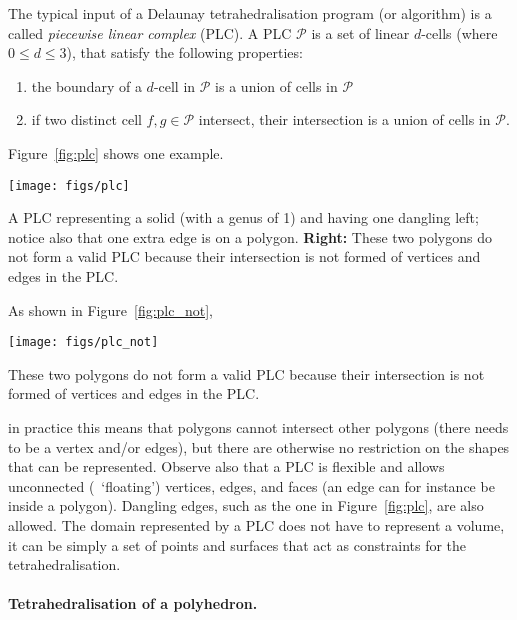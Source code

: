 The typical input of a Delaunay tetrahedralisation program (or algorithm) is a called \emph{piecewise linear complex} (PLC).
A PLC $\mathcal{P}$ is a set of linear $d$-cells (where $0 \leq d \leq 3$), that satisfy the following properties:
\begin{enumerate}
  \item the boundary of a $d$-cell in $\mathcal{P}$ is a union of cells in $\mathcal{P}$
  \item if two distinct cell $f, g \in \mathcal{P}$ intersect, their intersection is a union of cells in $\mathcal{P}$.
\end{enumerate}
Figure~\ref{fig:plc} shows one example.
\begin{marginfigure}
  \centering
  \texttt{[image: figs/plc]}
  \caption{A PLC representing a solid (with a genus of 1) and having one dangling left; notice also that one extra edge is on a polygon. \textbf{Right:} These two polygons do not form a valid PLC because their intersection is not formed of vertices and edges in the PLC.}%
\label{fig:plc}
\end{marginfigure}
As shown in Figure~\ref{fig:plc_not}, 
\begin{marginfigure}
  \centering
  \texttt{[image: figs/plc\_not]}
  \caption{These two polygons do not form a valid PLC because their intersection is not formed of vertices and edges in the PLC.}%
\label{fig:plc_not}
\end{marginfigure}
in practice this means that polygons cannot intersect other polygons (there needs to be a vertex and/or edges), but there are otherwise no restriction on the shapes that can be represented.
Observe also that a PLC is flexible and allows unconnected (\ie\ `floating') vertices, edges, and faces (an edge can for instance be inside a polygon).
Dangling edges, such as the one in Figure~\ref{fig:plc}, are also allowed.
The domain represented by a PLC does not have to represent a volume, it can be simply a set of points and surfaces that act as constraints for the tetrahedralisation.

\paragraph*{Tetrahedralisation of a polyhedron.}

